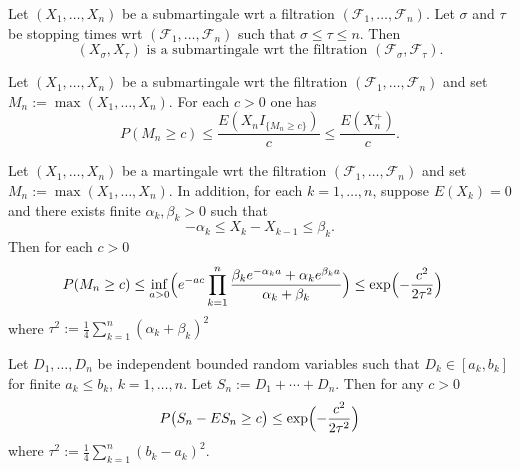 

\begin{theorem}
Let $(X_1,\ldots, X_n)$ be a submartingale wrt a filtration $(\mathcal F_1,\ldots, \mathcal F_n)$. Let $\sigma$ and $\tau$ be stopping times wrt $(\mathcal F_1,\ldots, \mathcal F_n)$  such that $\sigma\leq \tau\leq n$. Then
\[
\text{
$(X_\sigma, X_\tau)$ is a submartingale wrt the filtration $(\mathcal F_\sigma, \mathcal F_\tau)$.
}
\]
\end{theorem}



\begin{theorem}
Let $(X_1,\ldots, X_n)$ be a  submartingale wrt the filtration $(\mathcal F_1,\ldots, \mathcal F_n)$ and set $M_n:= \max(X_1, \ldots, X_n)$.  For each $c>0$ one has
\begin{equation}
P(M_n \geq c)\leq \frac{E(X_nI_{\{M_n\geq c\}})}{c} \leq \frac{E(X^+_n)}{c}.
\end{equation}
\end{theorem}


\begin{theorem}
Let $(X_1,\ldots, X_n)$ be a martingale wrt the filtration $(\mathcal F_1,\ldots, \mathcal F_n)$ and set $M_n:= \max(X_1, \ldots, X_n)$.  In addition, for each $k=1,\ldots, n$, suppose  $E(X_k)=0$ and there exists finite $\alpha_k,\beta_k>0$ such that
\[
-\alpha_k \leq X_k - X_{k-1} \leq \beta_k.
\]
Then for each $c>0$
\begin{align*}
P(M_n \geq c)
&\leq \inf_{a>0}\Bigl(e^{-ac}\prod_{k=1}^n\frac{\beta_k e^{-\alpha_k a}+\alpha_k e^{\beta_k a}}{\alpha_k + \beta_k} \Bigr) \leq \exp\Bigl(-\frac{c^2}{2\tau^2}\Bigr)
\end{align*}
where $\tau^2:= \frac{1}{4}\sum_{k=1}^n (\alpha_k+\beta_k)^2$
\end{theorem}


\begin{theorem}
Let $D_1,\ldots, D_n$ be independent bounded random variables such that $D_k\in [a_k, b_k]$ for  finite $a_k\leq b_k$, $k=1,\ldots, n$. Let $S_n:= D_1 + \cdots + D_n$. Then for any $c>0$
\[
P\bigl(S_n - ES_n \geq c\bigr) \leq \exp\Bigl(-\frac{c^2}{2\tau^2}\Bigr)
\]
where $\tau^2:= \frac{1}{4}\sum_{k=1}^n (b_k-a_k)^2$.
\end{theorem}


